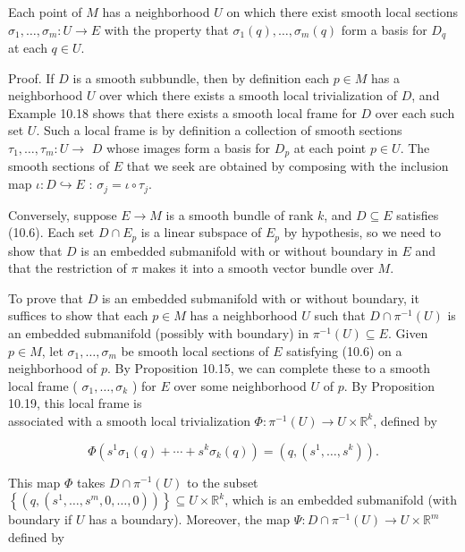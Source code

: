 \documentclass[10pt]{article}
\begin{document}
\begin{displayquote}
Each point of $M$ has a neighborhood $U$ on which there exist smooth local sections $\sigma_{1}, \ldots, \sigma_{m}: U \rightarrow E$ with the property that $\sigma_{1}(q), \ldots, \sigma_{m}(q)$ form a basis for $D_{q}$ at each $q \in U$.
\end{displayquote}

Proof. If $D$ is a smooth subbundle, then by definition each $p \in M$ has a neighborhood $U$ over which there exists a smooth local trivialization of $D$, and Example 10.18 shows that there exists a smooth local frame for $D$ over each such set $U$. Such a local frame is by definition a collection of smooth sections $\tau_{1}, \ldots, \tau_{m}: U \rightarrow$ $D$ whose images form a basis for $D_{p}$ at each point $p \in U$. The smooth sections of $E$ that we seek are obtained by composing with the inclusion map $\iota: D \hookrightarrow E$ : $\sigma_{j}=\iota \circ \tau_{j}$.

Conversely, suppose $E \rightarrow M$ is a smooth bundle of rank $k$, and $D \subseteq E$ satisfies (10.6). Each set $D \cap E_{p}$ is a linear subspace of $E_{p}$ by hypothesis, so we need to show that $D$ is an embedded submanifold with or without boundary in $E$ and that the restriction of $\pi$ makes it into a smooth vector bundle over $M$.

To prove that $D$ is an embedded submanifold with or without boundary, it suffices to show that each $p \in M$ has a neighborhood $U$ such that $D \cap \pi^{-1}(U)$ is an embedded submanifold (possibly with boundary) in $\pi^{-1}(U) \subseteq E$. Given $p \in M$, let $\sigma_{1}, \ldots, \sigma_{m}$ be smooth local sections of $E$ satisfying (10.6) on a neighborhood of $p$. By Proposition 10.15, we can complete these to a smooth local frame ( $\sigma_{1}, \ldots, \sigma_{k}$ ) for $E$ over some neighborhood $U$ of $p$. By Proposition 10.19, this local frame is\\
associated with a smooth local trivialization $\Phi: \pi^{-1}(U) \rightarrow U \times \mathbb{R}^{k}$, defined by

$$
\Phi\left(s^{1} \sigma_{1}(q)+\cdots+s^{k} \sigma_{k}(q)\right)=\left(q,\left(s^{1}, \ldots, s^{k}\right)\right) .
$$

This map $\Phi$ takes $D \cap \pi^{-1}(U)$ to the subset $\left\{\left(q,\left(s^{1}, \ldots, s^{m}, 0, \ldots, 0\right)\right)\right\} \subseteq U \times \mathbb{R}^{k}$, which is an embedded submanifold (with boundary if $U$ has a boundary). Moreover, the map $\Psi: D \cap \pi^{-1}(U) \rightarrow U \times \mathbb{R}^{m}$ defined by
\end{document}
